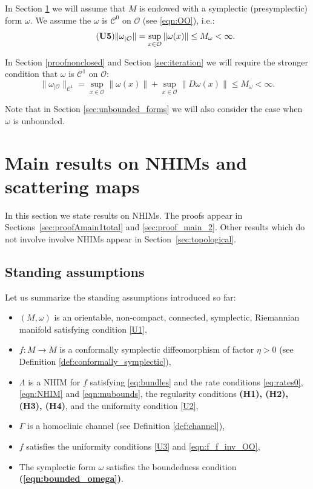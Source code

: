 \documentclass[11pt]{amsart}
\theoremstyle{definition}
\theoremstyle{remark}
\numberwithin{equation}{section}
\newcommand{\C}{\mathcal{C}}
\newcommand{\OO}{\mathcal{O}}
\begin{document}
In Section \ref{sec:mainresults} we will assume that $M$ is endowed with a symplectic (presymplectic) form $\omega$.
We assume the  $\omega$ is  $\C^0$ on $\OO$ (see \eqref{eqn:OO}), i.e.:
\begin{equation}\label{eqn:bounded_omega}
\tag{{\bf U5}}  \|\omega _{\mid\OO}\| =\sup _{x\in \OO}\|\omega(x)\|  \le M_\omega<\infty.
\end{equation}

In Section \ref{proofnonclosed} and Section \ref{sec:iteration} we will require the stronger condition  that $\omega$ is $\C^1$ on $\OO$:
\begin{equation}\label{doundedomega}\tag{\bf U5$^\prime$}
  \|\omega_{\mid\OO}\|_{\C^1} =\sup _{x\in \OO}\|\omega(x)\|+ \sup _{x\in \OO}\|D\omega(x)\|\le M_\omega<\infty.
\end{equation}

Note that in Section \ref{sec:unbounded_forms} we will also consider the case when $\omega$ is unbounded.





\section{Main results on NHIMs and scattering maps}\label{sec:mainresults}

In this section we state  results on NHIMs. The proofs appear in Sections~\ref{sec:proofAmain1total} and \ref{sec:proof_main_2}.
Other results which do not involve involve NHIMs appear in Section~\ref{sec:topological}.

\subsection{Standing assumptions}
\label{sec:standing}
Let us summarize the standing assumptions introduced so far:
\begin{itemize}
\item[(i)]
$(M,\omega)$ is an orientable, non-compact, connected, symplectic, Riemannian manifold satisfying condition \eqref{U1},
\item[(ii)]
$f:M\to M$ is a conformally symplectic diffeomorphism of  factor $\eta>0$ (see Definition \ref{def:conformally_symplectic}),
\item[(iii)]
$\Lambda$ is a NHIM for $f$ satisfying  \eqref{eq:bundles} and the rate conditions \eqref{eq:rates0}, \eqref{eqn:NHIM} and \eqref{eqn:mubounds},  the regularity conditions  \textbf{(H1), (H2), (H3), (H4)},
and the uniformity condition \eqref{U2},
\item[(iv)]
$\Gamma$ is a homoclinic channel (see Definition \ref{def:channel}),
\item [(v)]
$f$ satisfies the uniformity conditions  \eqref{U3} and \eqref{eqn:f_f_inv_OO},
\item[(vi)]
The symplectic form $\omega$ satisfies the boundedness condition  {\bf (\ref{eqn:bounded_omega})}.
\end{itemize}
\end{document}
